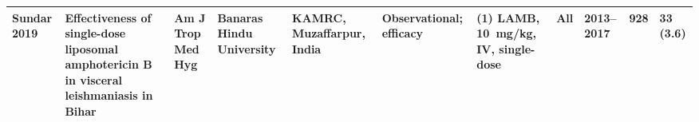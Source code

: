 \begin{ThreePartTable}
\begin{longtable}[c]{L{1.5cm} L{3.5cm} L{1.3cm} L{2.5cm} L{2.5cm} L{2.5cm} L{3cm} L{1.5cm} L{1cm} L{1cm} L{1.3cm}}
    Sundar 2019\cite{sundar2012prot,sundar2019}     & Effectiveness of single-dose liposomal amphotericin B in visceral leishmaniasis in Bihar                                                                                                                                    & Am J Trop Med Hyg        & Banaras Hindu University                                                             & KAMRC, Muzaffarpur, India                         & Observational; efficacy                                                            & (1) LAMB, 10~mg/kg, IV, single-dose                                                                                                                                                                                   & All         & 2013--2017   & 928          & 33 (3.6)                                                                                                                                                                                                                                                                                                                                                                                                                                                                                                                                                                                       \\ \bottomrule
  \end{longtable}
\end{ThreePartTable}


